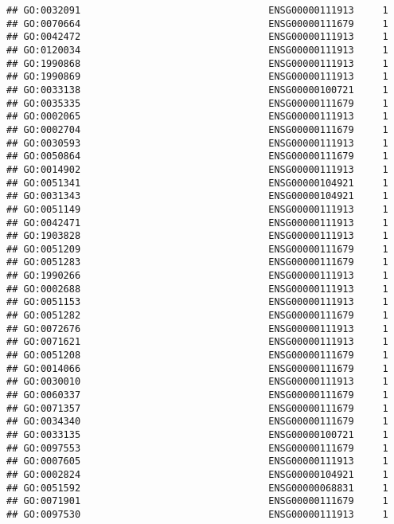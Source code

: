 \documentclass[
]{article}
\begin{document}
\begin{verbatim}
## GO:0032091                                 ENSG00000111913     1
## GO:0070664                                 ENSG00000111679     1
## GO:0042472                                 ENSG00000111913     1
## GO:0120034                                 ENSG00000111913     1
## GO:1990868                                 ENSG00000111913     1
## GO:1990869                                 ENSG00000111913     1
## GO:0033138                                 ENSG00000100721     1
## GO:0035335                                 ENSG00000111679     1
## GO:0002065                                 ENSG00000111913     1
## GO:0002704                                 ENSG00000111679     1
## GO:0030593                                 ENSG00000111913     1
## GO:0050864                                 ENSG00000111679     1
## GO:0014902                                 ENSG00000111913     1
## GO:0051341                                 ENSG00000104921     1
## GO:0031343                                 ENSG00000104921     1
## GO:0051149                                 ENSG00000111913     1
## GO:0042471                                 ENSG00000111913     1
## GO:1903828                                 ENSG00000111913     1
## GO:0051209                                 ENSG00000111679     1
## GO:0051283                                 ENSG00000111679     1
## GO:1990266                                 ENSG00000111913     1
## GO:0002688                                 ENSG00000111913     1
## GO:0051153                                 ENSG00000111913     1
## GO:0051282                                 ENSG00000111679     1
## GO:0072676                                 ENSG00000111913     1
## GO:0071621                                 ENSG00000111913     1
## GO:0051208                                 ENSG00000111679     1
## GO:0014066                                 ENSG00000111679     1
## GO:0030010                                 ENSG00000111913     1
## GO:0060337                                 ENSG00000111679     1
## GO:0071357                                 ENSG00000111679     1
## GO:0034340                                 ENSG00000111679     1
## GO:0033135                                 ENSG00000100721     1
## GO:0097553                                 ENSG00000111679     1
## GO:0007605                                 ENSG00000111913     1
## GO:0002824                                 ENSG00000104921     1
## GO:0051592                                 ENSG00000068831     1
## GO:0071901                                 ENSG00000111679     1
## GO:0097530                                 ENSG00000111913     1

\end{verbatim}
\end{document}
